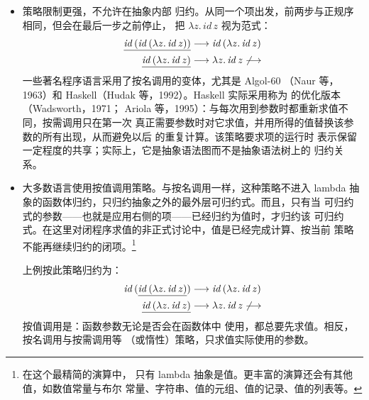 \begin{itemize}
  \item {}策略限制更强，不允许在抽象内部
    归约。从同一个项出发，前两步与正规序相同，但会在最后一步之前停止，
    把 \(\lambda z.\,\mathit{id}\,z\) 视为范式：
    \[
    \begin{aligned}
      \underline{\mathit{id}\,
        (\mathit{id}\,(\lambda z.\,\mathit{id}\,z))}
      &\mathrel{\longrightarrow} \mathit{id}\,(\lambda z.\,\mathit{id}\,z)\\
      \underline{\mathit{id}\,(\lambda z.\,\mathit{id}\,z)}
      &\mathrel{\longrightarrow} \lambda z.\,\mathit{id}\,z
      \not\mathrel{\longrightarrow}
    \end{aligned}
    \]
    一些著名程序语言采用了按名调用的变体，尤其是 Algol-60
    （Naur 等，1963）和 Haskell（Hudak 等，1992）。Haskell 实际采用称为
    的优化版本（Wadsworth，1971；
    Ariola 等，1995）：与每次用到参数时都重新求值不同，按需调用只在第一次
    真正需要参数时对它求值，并用所得的值替换该参数的所有出现，从而避免以后
    的重复计算。该策略要求项的运行时
    表示保留一定程度的共享；实际上，它是抽象语法图而不是抽象语法树上的
    归约关系。

  \item 大多数语言使用按值调用策略。与按名调用一样，这种策略不进入
    lambda 抽象的函数体归约，只归约抽象之外的最外层可归约式。而且，只有当
    可归约式的参数——也就是应用右侧的项——已经归约为值时，才归约该
    可归约式。在这里对闭程序求值的非正式讨论中，值是已经完成计算、按当前
    策略不能再继续归约的闭项。\footnote{
    在这个最精简的演算中，
    只有 lambda 抽象是值。更丰富的演算还会有其他值，如数值常量与布尔
    常量、字符串、值的元组、值的记录、值的列表等。}


    上例按此策略归约为：
    \[
    \begin{aligned}
      \mathit{id}\,
        (\underline{\mathit{id}\,(\lambda z.\,\mathit{id}\,z)})
      &\mathrel{\longrightarrow} \mathit{id}\,(\lambda z.\,\mathit{id}\,z)\\
      \underline{\mathit{id}\,(\lambda z.\,\mathit{id}\,z)}
      &\mathrel{\longrightarrow} \lambda z.\,\mathit{id}\,z
      \not\mathrel{\longrightarrow}
    \end{aligned}
    \]
    按值调用是：函数参数无论是否会在函数体中
    使用，都总要先求值。相反，按名调用与按需调用等
    （或惰性）策略，只求值实际使用的参数。
\end{itemize}

